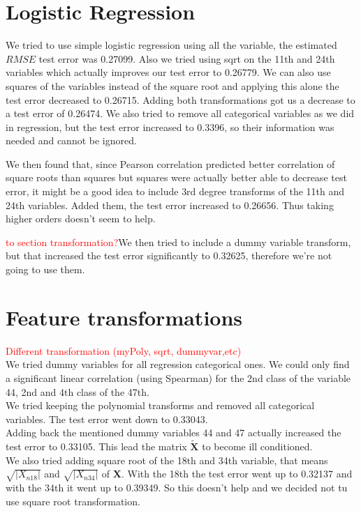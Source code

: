 \documentclass{article} %
\begin{document}
\section{Logistic Regression}
We tried to use simple logistic regression using all the variable, the estimated $RMSE$ test error was 0.27099. Also we tried using sqrt on the 11th and 24th variables which actually improves our test error to 0.26779. We can also use squares of the variables instead of the square root and applying this alone the test error decreased to 0.26715. Adding both transformations got us a decrease to a test error of 0.26474. We also tried to remove all categorical variables as we did in regression, but the test error increased to 0.3396, so their information was needed and cannot be ignored.

We then found that, since Pearson correlation predicted better correlation of square roots than squares but squares were actually better able to decrease test error, it might be a good idea to include 3rd degree transforms of the 11th and 24th variables. Added them, the test error increased to 0.26656. Thus taking higher orders doesn’t seem to help.

\textcolor{red}{to section transformation?}We then tried to include a dummy variable transform, but that increased the test error significantly to 0.32625, therefore we’re not going to use them.
\section{Feature transformations}
\textcolor{red}{Different transformation (myPoly, sqrt, dummyvar,etc)}\\

We tried dummy variables for all regression categorical ones. We could only find a significant linear correlation (using Spearman) for the 2nd class of the variable 44, 2nd and 4th class of the 47th.\\

We tried keeping the polynomial transforms and removed all categorical variables. The test error went down to 0.33043.\\

Adding back the mentioned dummy variables 44 and 47 actually increased the test error to 0.33105. This lead the matrix $\mathbf{\tilde{X}}$ to become ill conditioned.\\

We also tried adding square root of the 18th and 34th variable, that means $\sqrt{|X_{n18}|}$ and $\sqrt{|X_{n34}|}$ of $\mathbf{X}$. With the 18th the test error went up to 0.32137 and with the 34th it went up to 0.39349. So this doesn't help and we decided not tu use square root transformation.\\
\end{document}
